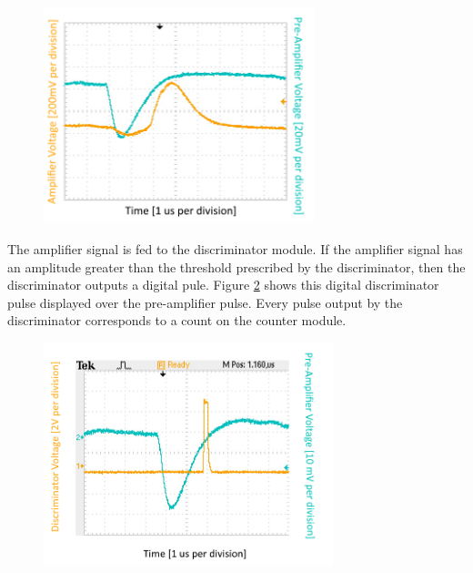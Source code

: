 \documentclass[a4paper]{article}
\begin{document}
\begin{figure}[H]
\centering
\includegraphics[width=0.7\textwidth]{gain20_th400mV_ch1amp_ch2preamp/preamp_amp.png}
\label{preamp_amp}
\end{figure}

The amplifier signal is fed to the discriminator module. If the amplifier signal has an amplitude greater than the threshold prescribed by the discriminator, then the discriminator outputs a digital pule. Figure \ref{preamp_discrim} shows this digital discriminator pulse displayed over the pre-amplifier pulse. Every pulse output by the discriminator corresponds to a count on the counter module.

\begin{figure}[H]
\centering
\includegraphics[width=0.75\textwidth]{ch2preamp_ch1discrim_gain20_maybe4mVthreshold/preamp_discrim.png}
\label{preamp_discrim}
\end{figure}
\end{document}
